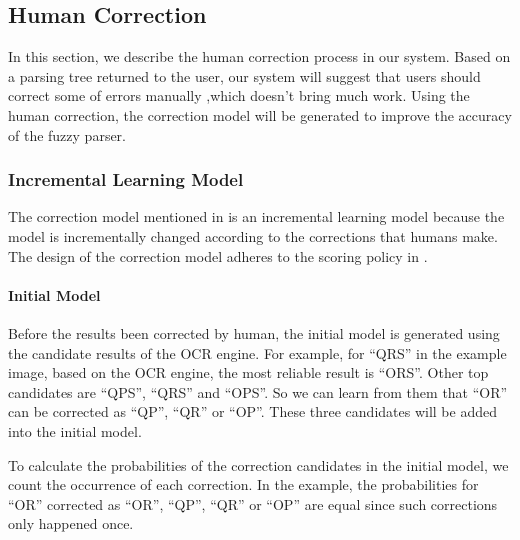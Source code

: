 \subsection{Human Correction}
\label{sec:correction}
In this section, we describe the human correction process in our system. 
Based on a parsing tree returned to the user, 
our system will suggest that users should correct some of errors manually ,which doesn't bring much work. 
Using the human correction, the correction model 
will be generated to improve the accuracy of the fuzzy parser. 

\subsubsection{Incremental Learning Model}
\label{sec:incremental}
The correction model mentioned in  
is an incremental learning model because 
the model is incrementally changed according to the corrections that 
humans make. The design of the correction model adheres to the scoring
policy in .

\paragraph{Initial Model}
Before the results been corrected by human, 
the initial model is generated using the candidate results of the OCR 
engine. For example, for ``QRS'' in the example image, based on the OCR 
engine, the most reliable result is ``ORS''. Other top candidates are 
``QPS'', ``QRS'' and ``OPS''. So we can learn from them that ``OR'' can be 
corrected as ``QP'', ``QR'' or ``OP''. These three candidates 
will be added into the initial model. 

To calculate the probabilities of the correction candidates in the initial 
model, we count the occurrence of each correction. In the example, the 
probabilities for ``OR'' corrected as ``OR'', ``QP'', ``QR'' or ``OP'' are equal 
since such corrections only happened once. 


